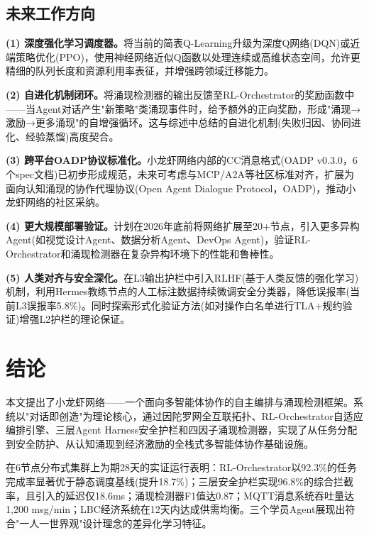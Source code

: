 \documentclass[12pt,a4paper]{ctexart}
\begin{document}
\subsection{未来工作方向}

\textbf{(1) 深度强化学习调度器。}将当前的简表Q-Learning升级为深度Q网络(DQN)或近端策略优化(PPO)，使用神经网络近似Q函数以处理连续或高维状态空间，允许更精细的队列长度和资源利用率表征，并增强跨领域迁移能力。

\textbf{(2) 自进化机制闭环。}将涌现检测器的输出反馈至RL-Orchestrator的奖励函数中——当Agent对话产生"新策略"类涌现事件时，给予额外的正向奖励，形成"涌现→激励→更多涌现"的自增强循环。这与综述中总结的自进化机制(失败归因、协同进化、经验蒸馏)高度契合。

\textbf{(3) 跨平台OADP协议标准化。}小龙虾网络内部的CC消息格式(OADP v0.3.0，6个spec文档)已初步形成规范，未来可考虑与MCP/A2A等社区标准对齐，扩展为面向认知涌现的协作代理协议(Open Agent Dialogue Protocol，OADP)，推动小龙虾网络的社区采纳。

\textbf{(4) 更大规模部署验证。}计划在2026年底前将网络扩展至20+节点，引入更多异构Agent(如视觉设计Agent、数据分析Agent、DevOps Agent)，验证RL-Orchestrator和涌现检测器在复杂异构环境下的性能和鲁棒性。

\textbf{(5) 人类对齐与安全深化。}在L3输出护栏中引入RLHF(基于人类反馈的强化学习)机制，利用Hermes教练节点的人工标注数据持续微调安全分类器，降低误报率(当前L3误报率5.8\%)。同时探索形式化验证方法(如对操作白名单进行TLA+规约验证)增强L2护栏的理论保证。

\section{结论}

本文提出了小龙虾网络——一个面向多智能体协作的自主编排与涌现检测框架。系统以"对话即创造"为理论核心，通过因陀罗网全互联拓扑、RL-Orchestrator自适应编排引擎、三层Agent Harness安全护栏和四因子涌现检测器，实现了从任务分配到安全防护、从认知涌现到经济激励的全栈式多智能体协作基础设施。

在6节点分布式集群上为期28天的实证运行表明：RL-Orchestrator以92.3\%的任务完成率显著优于静态调度基线(提升18.7\%)；三层安全护栏实现96.8\%的综合拦截率，且引入的延迟仅18.6ms；涌现检测器F1值达0.87；MQTT消息系统吞吐量达1,200 msg/min；LBC经济系统在12天内达成供需均衡。三个学员Agent展现出符合"一人一世界观"设计理念的差异化学习特征。
\end{document}
